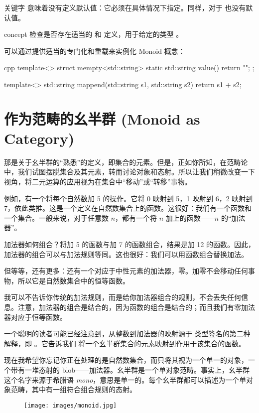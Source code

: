 关键字  意味着没有定义默认值：它必须在具体情况下指定。同样，对于  也没有默认值。

concept  检查是否存在适当的  和  定义，用于给定的类型 。

可以通过提供适当的专门化和重载来实例化 Monoid 概念：

\begin{snip}{cpp}
  template<>
  struct mempty<std::string> {
    static std::string value() { return ""; }
  };

  template<>
  std::string mappend(std::string s1, std::string s2) {
    return s1 + s2;
  }
\end{snip}

\section{作为范畴的幺半群 (Monoid as Category)}

那是关于幺半群的“熟悉”的定义，即集合的元素。但是，正如你所知，在范畴论中，我们试图摆脱集合及其元素，转而讨论对象和态射。所以让我们稍微改变一下视角，将二元运算的应用视为在集合中“移动”或“转移”事物。

例如，有一个将每个自然数加 5 的操作。它将 0 映射到 5，1 映射到 6，2 映射到 7，依此类推。这是一个定义在自然数集合上的函数。这很好：我们有一个函数和一个集合。一般来说，对于任意数 $n$，都有一个将 $n$ 加上的函数——$n$ 的“加法器”。

加法器如何组合？将加 5 的函数与加 7 的函数组合，结果是加 12 的函数。因此，加法器的组合可以与加法规则等同。这也很好：我们可以用函数组合替换加法。

但等等，还有更多：还有一个对应于中性元素的加法器，零。加零不会移动任何事物，所以它是自然数集合中的恒等函数。

我可以不告诉你传统的加法规则，而是给你加法器组合的规则，不会丢失任何信息。注意，加法器的组合是结合的，因为函数的组合是结合的；而且我们有零加法器对应于恒等函数。

一个聪明的读者可能已经注意到，从整数到加法器的映射源于  类型签名的第二种解释，即 。它告诉我们  将一个幺半群集合的元素映射到作用于该集合的函数。

现在我希望你忘记你正在处理的是自然数集合，而只将其视为一个单一的对象，一个带有一堆态射的 blob——加法器。幺半群是一个单对象范畴。事实上，幺半群这个名字来源于希腊语 \emph{mono}，意思是单一的。每个幺半群都可以描述为一个单对象范畴，其中有一组符合组合规则的态射。

\begin{figure}[H]
  \centering
  \texttt{[image: images/monoid.jpg]}
\end{figure}

